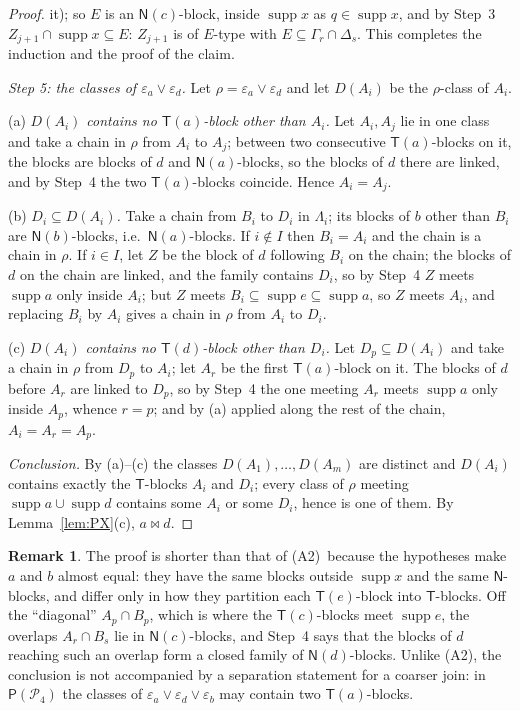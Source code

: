 \documentclass[11pt]{amsart}
\theoremstyle{definition}
\newtheorem{remark}[theorem]{Remark}
\renewcommand{\P}{\mathcal{P}}      %
\newcommand{\PA}{\mathsf{P}}         %
\newcommand{\supp}{\operatorname{supp}}
\newcommand{\T}{\mathsf{T}}
\newcommand{\N}{\mathsf{N}}
\newcommand{\mt}{\bowtie}      %
\newcommand{\Rp}{\textup{(A2)}}        %
\begin{document}
\begin{proof}
it); so $E$ is an $\N(c)$-block, inside $\supp x$ as $q\in\supp x$, and by Step~3 $Z_{j+1}\cap\supp x\subseteq E$: $Z_{j+1}$ is of $E$-type with $E\subseteq\Gamma_r\cap\Delta_s$. This completes the induction and the proof of the claim.

\smallskip
\emph{Step 5: the classes of $\varepsilon_a\vee\varepsilon_d$.} Let $\rho=\varepsilon_a\vee\varepsilon_d$ and let $D(A_i)$ be the $\rho$-class of $A_i$.

(a) \emph{$D(A_i)$ contains no $\T(a)$-block other than $A_i$.} Let $A_i,A_j$ lie in one class and take a chain in $\rho$ from $A_i$ to $A_j$; between two consecutive $\T(a)$-blocks on it, the blocks are blocks of $d$ and $\N(a)$-blocks, so the blocks of $d$ there are linked, and by Step~4 the two $\T(a)$-blocks coincide. Hence $A_i=A_j$.

(b) \emph{$D_i\subseteq D(A_i)$.} Take a chain from $B_i$ to $D_i$ in $\Lambda_i$; its blocks of $b$ other than $B_i$ are $\N(b)$-blocks, i.e.\ $\N(a)$-blocks. If $i\notin I$ then $B_i=A_i$ and the chain is a chain in $\rho$. If $i\in I$, let $Z$ be the block of $d$ following $B_i$ on the chain; the blocks of $d$ on the chain are linked, and the family contains $D_i$, so by Step~4 $Z$ meets $\supp a$ only inside $A_i$; but $Z$ meets $B_i\subseteq\supp e\subseteq\supp a$, so $Z$ meets $A_i$, and replacing $B_i$ by $A_i$ gives a chain in $\rho$ from $A_i$ to $D_i$.

(c) \emph{$D(A_i)$ contains no $\T(d)$-block other than $D_i$.} Let $D_p\subseteq D(A_i)$ and take a chain in $\rho$ from $D_p$ to $A_i$; let $A_r$ be the first $\T(a)$-block on it. The blocks of $d$ before $A_r$ are linked to $D_p$, so by Step~4 the one meeting $A_r$ meets $\supp a$ only inside $A_p$, whence $r=p$; and by (a) applied along the rest of the chain, $A_i=A_r=A_p$.

\emph{Conclusion.} By (a)--(c) the classes $D(A_1),\dots,D(A_m)$ are distinct and $D(A_i)$ contains exactly the $\T$-blocks $A_i$ and $D_i$; every class of $\rho$ meeting $\supp a\cup\supp d$ contains some $A_i$ or some $D_i$, hence is one of them. By Lemma~\ref{lem:PX}(c), $a\mt d$.
\end{proof}

\begin{remark}\label{rem:P1}
The proof is shorter than that of \Rp\ because the hypotheses make $a$ and $b$ almost equal: they have the same blocks outside $\supp x$ and the same $\N$-blocks, and differ only in how they partition each $\T(e)$-block into $\T$-blocks. Off the ``diagonal'' $A_p\cap B_p$, which is where the $\T(c)$-blocks meet $\supp e$, the overlaps $A_r\cap B_s$ lie in $\N(c)$-blocks, and Step~4 says that the blocks of $d$ reaching such an overlap form a closed family of $\N(d)$-blocks. Unlike \Rp, the conclusion is not accompanied by a separation statement for a coarser join: in $\PA(\P_4)$ the classes of $\varepsilon_a\vee\varepsilon_d\vee\varepsilon_b$ may contain two $\T(a)$-blocks.
\end{remark}
\end{document}
